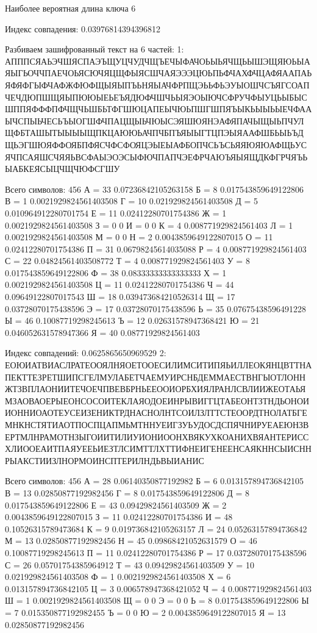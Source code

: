 \documentclass[a4paper, 14pt]{extarticle}
\begin{document}
Наиболее вероятная длина ключа 6

Индекс совпадения: 0.03976814394396812

Разбиваем зашифрованный текст на 6 частей:
1: АПППСЯАЬЭЧШЯСПАЭЪЩУЦЧУДЧЩЪЕЧЫФАЧОЬЫЬЯЧЩЬЫШЭЩЯЮЬЫАЯЫГЬОЧЧПАЕЧОЬЯСЮЧЯЦЩФЫЯСШЧАЯЭЭЭЦЮЬПЬФЧАХФЧЦАФЯААПАЬЯФЯФГЫФЧАФЖФЮФЩЫЯЫПЪЬНЯЫАЧФРПЩЭЬЬФЬЭУЫОШЧСЪЯГСОАПЧЕЧДЮПШЩЯЫПЮЮЫЕЬЕЪЯДЮФЧШЧЬЫЯЭОЫЮЧСФРУЧФЫУЦЬЫБЫСШППЯФФФПФЧЩЧЬШБЬТФГШЮЦАПЕЫЧЮЬПШГШПЯЪЫКЬЫЫЬЫЕЧФААЫЧСПЫЬЧЕСЬЪЫОГШФЧПАЦЩЫЬЧЮЫСЭЯШЮЯНЭАФЯПАЧЫЩЫЬПЧУЛЩФБТАШЫТЫЫЫЫЩПКЦАЮЮЬАЧПЧБПЪЯЫЫГТЦПЭЫЯААФШБЬЫЬЪДЩЬЭГШЮЯФФОЯБПФЯСЧФСФОЯЦЭЫЕЫАФБОПЧСЬЪСЬЯЯЮЯЮАФЩЬУСЯЧПСАЯШСЧЯЯЬВСФАЫЭОЭСЫФЮЧПАПЧЭЕФРЧАЮЪЯЫЯЩДКФГРЧЯЪЬЫАБКЕЯСЫЦЧЩЧЮФСГШУ

Всего символов: 456
А = 33
0.07236842105263158
Б = 8
0.017543859649122806
В = 1
0.0021929824561403508
Г = 10
0.021929824561403508
Д = 5
0.010964912280701754
Е = 11
0.02412280701754386
Ж = 1
0.0021929824561403508
З = 0
0
И = 0
0
К = 4
0.008771929824561403
Л = 1
0.0021929824561403508
М = 0
0
Н = 2
0.0043859649122807015
О = 11
0.02412280701754386
П = 31
0.06798245614035088
Р = 4
0.008771929824561403
С = 22
0.04824561403508772
Т = 4
0.008771929824561403
У = 8
0.017543859649122806
Ф = 38
0.08333333333333333
Х = 1
0.0021929824561403508
Ц = 11
0.02412280701754386
Ч = 44
0.09649122807017543
Ш = 18
0.039473684210526314
Щ = 17
0.03728070175438596
Э = 17
0.03728070175438596
Ь = 35
0.07675438596491228
Ы = 46
0.10087719298245613
Ъ = 12
0.02631578947368421
Ю = 21
0.046052631578947366
Я = 40
0.08771929824561403

Индекс совпадений: 0.0625865650969529
2: ЕОЮИАТВИАСЛРАТЕООЯЛНЯОЕТООЕСИЛИМСИТИПЯЬИЛЛЕОКЯНЦВТТНАПЕКТТЕЗРЕТШИПСГЕЛМУЛАБЕТЧАЕМУИРСНБДЕММАЕСТВНГЫОТЛОННЖТЗВПЛАОНИИТЕЧОЕЧПВЕВБРНЬЕЕООИОРБХИЯЛРАНЛСВЛИИЖЕОТАЬЯМЗАОВАОЕРЫЕОНСОСОИТЕКЛАЯОДОЕИНРЫВИГГЦТАБЕОНТЗТНДЬОНОИИОННИОАОТЕУСЕИЗЕНИКТРДНАСНОЛНТСОИЛЗЛТТСТЕООРДТНОЛАТБГЕМНКНСТЯТИАОТПОСПЦАПМЬМТННУЕИГЗУЬУДОСДСПЯЧНИРУЕАЕЮНЗВЕРТМЛНРАМОТНЗЫГОИИТИЛИУИОНИООНХВЯКУХКОАНИХВЯАНТЕРИССХЛИООЕАИТПАЯУЕЕЬИЕЗТЛСИМТТЛХТТИФНЕИГЕНЕЕНСАЯКННСЫИСННРЫАКСТИИЗЛНОРМОИНСПТЕРИЛНДЬВЫИАНИС

Всего символов: 456
А = 28
0.06140350877192982
Б = 6
0.013157894736842105
В = 13
0.02850877192982456
Г = 8
0.017543859649122806
Д = 8
0.017543859649122806
Е = 43
0.09429824561403509
Ж = 2
0.0043859649122807015
З = 11
0.02412280701754386
И = 48
0.10526315789473684
К = 9
0.019736842105263157
Л = 24
0.05263157894736842
М = 13
0.02850877192982456
Н = 45
0.09868421052631579
О = 46
0.10087719298245613
П = 11
0.02412280701754386
Р = 17
0.03728070175438596
С = 26
0.05701754385964912
Т = 43
0.09429824561403509
У = 10
0.021929824561403508
Ф = 1
0.0021929824561403508
Х = 6
0.013157894736842105
Ц = 3
0.006578947368421052
Ч = 4
0.008771929824561403
Ш = 1
0.0021929824561403508
Щ = 0
0
Э = 0
0
Ь = 8
0.017543859649122806
Ы = 7
0.015350877192982455
Ъ = 0
0
Ю = 2
0.0043859649122807015
Я = 13
0.02850877192982456
\end{document}
